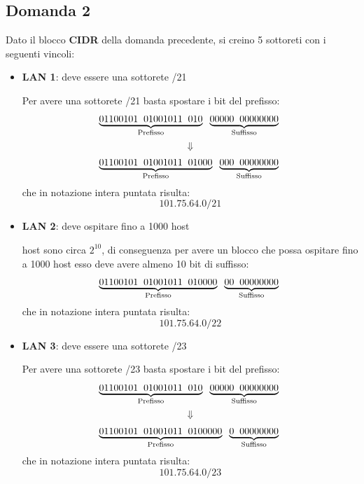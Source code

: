 \documentclass[a4paper]{article}
\begin{document}
\subsection{Domanda 2}
Dato il blocco \textbf{CIDR} della domanda precedente, si creino 5 sottoreti con i
seguenti vincoli:
\begin{itemize}
  \item \textbf{LAN 1}: deve essere una sottorete /21

    \vspace{1em}
    \noindent
    Per avere una sottorete /21 basta spostare i bit del prefisso:
    \[
      \underbrace{01100101 \;\; 01001011 \;\; 010}_{\text{Prefisso}}
      \;\; \underbrace{00000 \;\; 00000000}_{\text{Suffisso}}\\
    \]
    \[
      \Downarrow
    \]
    \[
      \underbrace{01100101 \;\; 01001011 \;\; 01000}_{\text{Prefisso}}
      \;\; \underbrace{000 \;\; 00000000}_{\text{Suffisso}}\\
    \] 
    che in notazione intera puntata risulta:
    \[
      101.75.64.0/21
    \] 

  \item \textbf{LAN 2}: deve ospitare fino a 1000 host

    \vspace{1em}
     host sono circa \( 2^{10} \), di conseguenza per avere un blocco che possa
    ospitare fino a 1000 host esso deve avere almeno 10 bit di suffisso:
    \[
      \underbrace{01100101 \;\; 01001011 \;\; 010000}_{\text{Prefisso}}
      \;\; \underbrace{00 \;\; 00000000}_{\text{Suffisso}}\\
    \] 
    che in notazione intera puntata risulta:
    \[
      101.75.64.0/22
    \] 

  \item \textbf{LAN 3}: deve essere una sottorete /23

    \vspace{1em}
    \noindent
    Per avere una sottorete /23 basta spostare i bit del prefisso:
    \[
      \underbrace{01100101 \;\; 01001011 \;\; 010}_{\text{Prefisso}}
      \;\; \underbrace{00000 \;\; 00000000}_{\text{Suffisso}}\\
    \]
    \[
      \Downarrow
    \]
    \[
      \underbrace{01100101 \;\; 01001011 \;\; 0100000}_{\text{Prefisso}}
      \;\; \underbrace{0 \;\; 00000000}_{\text{Suffisso}}\\
    \] 
    che in notazione intera puntata risulta:
    \[
      101.75.64.0/23
    \] 


\end{itemize}
\end{document}
